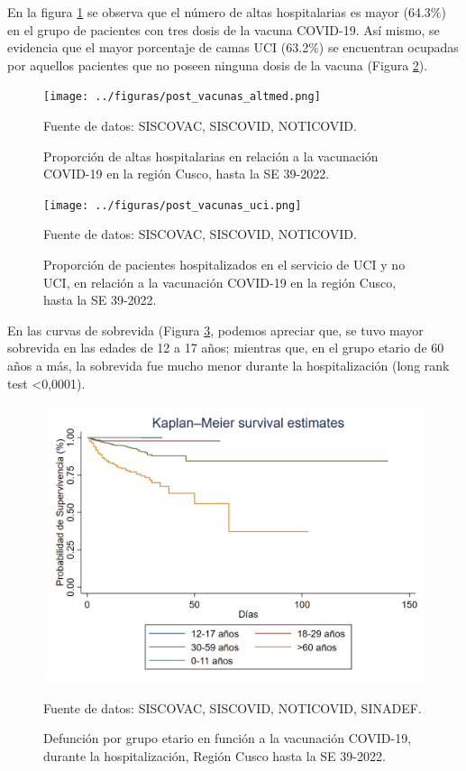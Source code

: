 \documentclass[12pt,a4paper,openany]{book}
\begin{document}
	En la figura \ref{fig:altas_postvacunación} se observa que el número de altas hospitalarias es mayor (64.3$\%$) en el grupo de pacientes con tres dosis de la vacuna COVID-19. Así mismo, se evidencia que el mayor porcentaje de camas UCI (63.2$\%$) se encuentran ocupadas por aquellos pacientes que no poseen ninguna dosis de la vacuna (Figura \ref{fig:uci_postvacunación}).

\begin{figure}[h]
	\caption{Proporción de altas hospitalarias en relación a la vacunación COVID-19 en la región Cusco, hasta la SE 39-2022.}\label{fig:altas_postvacunación}
	\begin{center}
		\texttt{[image: ../figuras/post\_vacunas\_altmed.png]}
	\end{center}
	{\footnotesize {Fuente de datos: SISCOVAC, SISCOVID, NOTICOVID.}}
\end{figure}

\begin{figure}[h]
	\caption{Proporción de pacientes hospitalizados en el servicio de UCI y no UCI, en relación a la vacunación COVID-19 en la región Cusco, hasta la SE 39-2022.}\label{fig:uci_postvacunación}
	\begin{center}
		\texttt{[image: ../figuras/post\_vacunas\_uci.png]}
	\end{center}
	{\footnotesize {Fuente de datos: SISCOVAC, SISCOVID, NOTICOVID.}}
\end{figure}
	
	\clearpage
	 En las curvas de sobrevida (Figura \ref{fig:supervivencia2}, podemos apreciar que, se tuvo mayor sobrevida en las edades de 12 a 17 años; mientras que, en el grupo etario de 60 años a más, la sobrevida fue mucho menor durante la hospitalización (long rank test <0,0001).
	
	\begin{figure}[h]
		\caption{Defunción por grupo etario en función a la vacunación COVID-19, durante la hospitalización, Región Cusco hasta la SE 39-2022.}\label{fig:supervivencia2}
		\begin{center}
			\includegraphics[width=0.95\linewidth]{../figuras/supervivencia_2.png}
		\end{center}
		{\footnotesize {Fuente de datos: SISCOVAC, SISCOVID, NOTICOVID, SINADEF.}}
	\end{figure}
	
\end{document}
